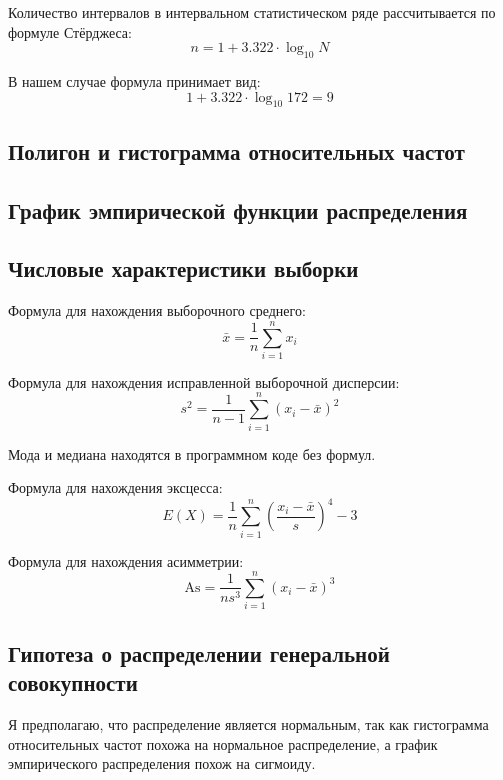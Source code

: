 Количество интервалов в интервальном статистическом ряде рассчитывается по формуле Стёрджеса:
\[n = 1 + 3.322 \cdot \log_{10}{N}\]

В нашем случае формула принимает вид:
\[1 + 3.322 \cdot \log_{10}{172} = 9\]

\subsection*{Полигон и гистограмма относительных частот}

\subsection*{График эмпирической функции распределения}

\subsection*{Числовые характеристики выборки}

Формула для нахождения выборочного среднего:
\[\bar{x} = \frac{1}{n} \sum_{i=1}^{n} x_i\]

Формула для нахождения исправленной выборочной дисперсии:
\[s^2 = \frac{1}{n-1} \sum_{i=1}^{n} (x_i - \bar{x})^2\]

Мода и медиана находятся в программном коде без формул.

Формула для нахождения эксцесса:
\[E(X) = \frac{1}{n} \sum_{i=1}^{n} \left( \frac{x_i - \bar{x}}{s} \right)^4 - 3\]

Формула для нахождения асимметрии:
\[\text{As} = \frac{1}{n s^3} \sum_{i=1}^{n} (x_i - \bar{x})^3\]

\begin{spacing}{1.0}
    
\end{spacing}

\subsection*{Гипотеза о распределении генеральной совокупности}

Я предполагаю, что распределение является нормальным, так как гистограмма относительных частот похожа на нормальное распределение, а график эмпирического распределения похож на сигмоиду.

